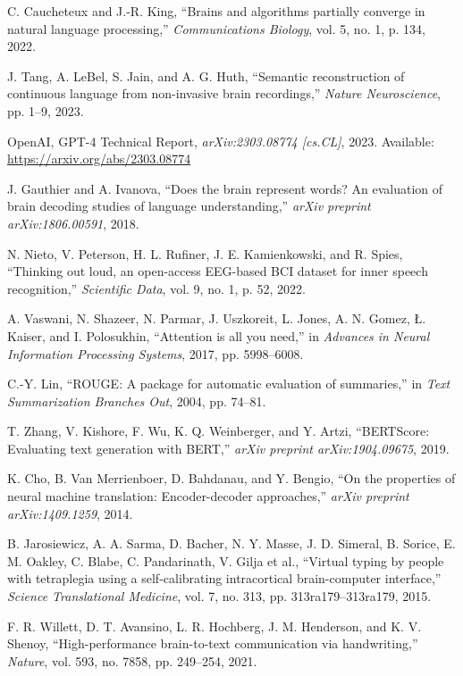 \documentclass[journal]{IEEEtran}
\begin{document}
\begin{thebibliography}{1}
	C. Caucheteux and J.-R. King, ``Brains and algorithms partially converge in natural language processing,'' \textit{Communications Biology}, vol. 5, no. 1, p. 134, 2022.
	
	J. Tang, A. LeBel, S. Jain, and A. G. Huth, ``Semantic reconstruction of continuous language from non-invasive brain recordings,'' \textit{Nature Neuroscience}, pp. 1–9, 2023.
	
	OpenAI, GPT-4 Technical Report, \textit{arXiv:2303.08774 [cs.CL]}, 2023. Available: \url{https://arxiv.org/abs/2303.08774}
	
	J. Gauthier and A. Ivanova, ``Does the brain represent words? An evaluation of brain decoding studies of language understanding,'' \textit{arXiv preprint arXiv:1806.00591}, 2018.
	
	N. Nieto, V. Peterson, H. L. Rufiner, J. E. Kamienkowski, and R. Spies, ``Thinking out loud, an open-access EEG-based BCI dataset for inner speech recognition,'' \textit{Scientific Data}, vol. 9, no. 1, p. 52, 2022.
	
	A. Vaswani, N. Shazeer, N. Parmar, J. Uszkoreit, L. Jones, A. N. Gomez, Ł. Kaiser, and I. Polosukhin, ``Attention is all you need,'' in \textit{Advances in Neural Information Processing Systems}, 2017, pp. 5998–6008.
	
	C.-Y. Lin, ``ROUGE: A package for automatic evaluation of summaries,'' in \textit{Text Summarization Branches Out}, 2004, pp. 74–81.
	
	T. Zhang, V. Kishore, F. Wu, K. Q. Weinberger, and Y. Artzi, ``BERTScore: Evaluating text generation with BERT,'' \textit{arXiv preprint arXiv:1904.09675}, 2019.
	
	K. Cho, B. Van Merrienboer, D. Bahdanau, and Y. Bengio, ``On the properties of neural machine translation: Encoder-decoder approaches,'' \textit{arXiv preprint arXiv:1409.1259}, 2014.
	
	B. Jarosiewicz, A. A. Sarma, D. Bacher, N. Y. Masse, J. D. Simeral, B. Sorice, E. M. Oakley, C. Blabe, C. Pandarinath, V. Gilja et al., ``Virtual typing by people with tetraplegia using a self-calibrating intracortical brain-computer interface,'' \textit{Science Translational Medicine}, vol. 7, no. 313, pp. 313ra179–313ra179, 2015.
	
	F. R. Willett, D. T. Avansino, L. R. Hochberg, J. M. Henderson, and K. V. Shenoy, ``High-performance brain-to-text communication via handwriting,'' \textit{Nature}, vol. 593, no. 7858, pp. 249–254, 2021.
	

\end{thebibliography}
\end{document}
